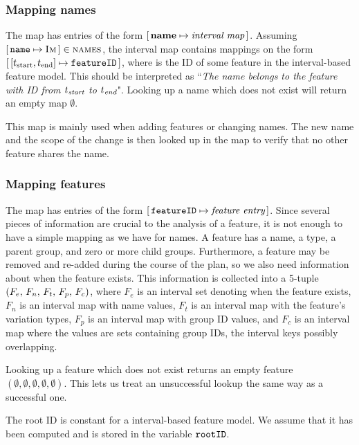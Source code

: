 \subsubsection{Mapping names}
\label{ssub:mapping-names}

The \names{} map has entries of the form $[ \,\textbf{name}{} \mapsto \textit{interval map}\, ]$. Assuming $[ \,\texttt{name} \mapsto \textsc{Im}\, ] \in \textsc{names}$, the interval map  contains mappings on the form $\intervalmapping{t_\text{start}}{t_\text{end}}{\var{featureID}}$, where  is the ID of some feature in the interval-based feature model. This should be interpreted as ``\emph{The name \emph{} belongs to the feature with ID \emph{} from $t_{\emph{\text{start}}}$ to $t_{\emph{\text{end}}}$}". Looking up a name which does not exist will return an empty map $\emptyset$. 

This map is mainly used when adding features or changing names. The new name and the scope of the change is then looked up in the \names{} map to verify that no other feature shares the name.

\subsubsection{Mapping features}
\label{ssub:mapping-features}

The \features{} map has entries of the form $[ \,\texttt{featureID} \mapsto \textit{feature entry}\, ]$. Since several pieces of information are crucial to the analysis of a feature, it is not enough to have a simple mapping as we have for names.
A feature has a name, a type, a parent group, and zero or more child groups. Furthermore, a feature may be removed and re-added during the course of the plan, so we also need information about when the feature exists.
This information is collected into a 5-tuple $\left(F_e,\, F_n,\, F_t,\, F_p,\, F_c\right)$, where $F_e$ is an interval set denoting when the feature exists, $F_n$ is an interval map with name values, $F_t$ is an interval map with the feature's variation types, $F_p$ is an interval map with group ID values, and $F_c$ is an interval map where the values are sets containing group IDs, the interval keys possibly overlapping.

Looking up a feature which does not exist returns an empty feature $(\emptyset \comma \emptyset \comma \emptyset \comma \emptyset \comma \emptyset)$. This lets us treat an unsuccessful lookup the same way as a successful one.

The root ID is constant for a interval-based feature model. We assume that it has been computed and is stored in the variable $\texttt{rootID}$. 

